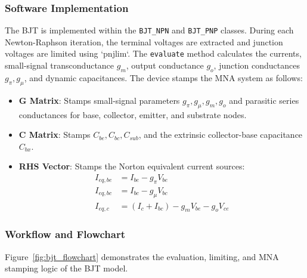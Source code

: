 \subsubsection{Software Implementation}
The BJT is implemented within the \texttt{BJT\_NPN} and \texttt{BJT\_PNP} classes.
During each Newton-Raphson iteration, the terminal voltages are extracted and junction voltages are limited using `pnjlim`. The \texttt{evaluate} method calculates the currents, small-signal transconductance $g_m$, output conductance $g_o$, junction conductances $g_{\pi}, g_{\mu}$, and dynamic capacitances.
The device stamps the MNA system as follows:
\begin{itemize}
    \item \textbf{G Matrix}: Stamps small-signal parameters $g_{\pi}, g_{\mu}, g_m, g_o$ and parasitic series conductances for base, collector, emitter, and substrate nodes.
    \item \textbf{C Matrix}: Stamps $C_{be}, C_{bc}, C_{sub}$, and the extrinsic collector-base capacitance $C_{bx}$.
    \item \textbf{RHS Vector}: Stamps the Norton equivalent current sources:
    \begin{align}
        I_{eq,be} &= I_{be} - g_{\pi} V_{be} \\
        I_{eq,bc} &= I_{bc} - g_{\mu} V_{bc} \\
        I_{eq,c} &= (I_c + I_{bc}) - g_m V_{be} - g_o V_{ce}
    \end{align}
\end{itemize}

\subsubsection{Workflow and Flowchart}
Figure~\ref{fig:bjt_flowchart} demonstrates the evaluation, limiting, and MNA stamping logic of the BJT model.

